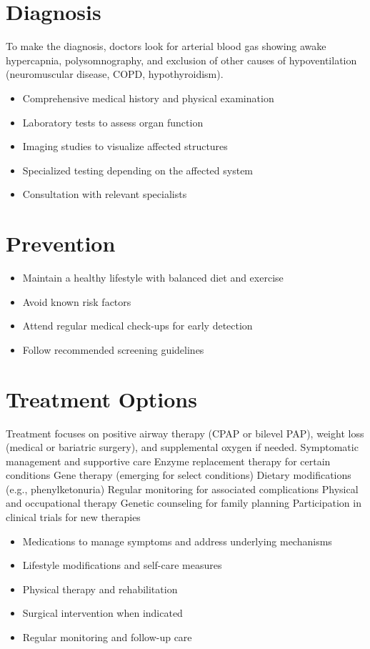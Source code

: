 \section{Diagnosis}
To make the diagnosis, doctors look for arterial blood gas showing awake hypercapnia, polysomnography, and exclusion of other causes of hypoventilation (neuromuscular disease, COPD, hypothyroidism).

\begin{itemize}[noitemsep]
  \item Comprehensive medical history and physical examination
  \item Laboratory tests to assess organ function
  \item Imaging studies to visualize affected structures
  \item Specialized testing depending on the affected system
  \item Consultation with relevant specialists
\end{itemize}
\section{Prevention}
\begin{itemize}[noitemsep]
  \item Maintain a healthy lifestyle with balanced diet and exercise
  \item Avoid known risk factors
  \item Attend regular medical check-ups for early detection
  \item Follow recommended screening guidelines
\end{itemize}
\section{Treatment Options}
Treatment focuses on positive airway therapy (CPAP or bilevel PAP), weight loss (medical or bariatric surgery), and supplemental oxygen if needed. Symptomatic management and supportive care Enzyme replacement therapy for certain conditions Gene therapy (emerging for select conditions) Dietary modifications (e.g., phenylketonuria) Regular monitoring for associated complications Physical and occupational therapy Genetic counseling for family planning Participation in clinical trials for new therapies

\begin{itemize}[noitemsep]
  \item Medications to manage symptoms and address underlying mechanisms
  \item Lifestyle modifications and self-care measures
  \item Physical therapy and rehabilitation
  \item Surgical intervention when indicated
  \item Regular monitoring and follow-up care
\end{itemize}
